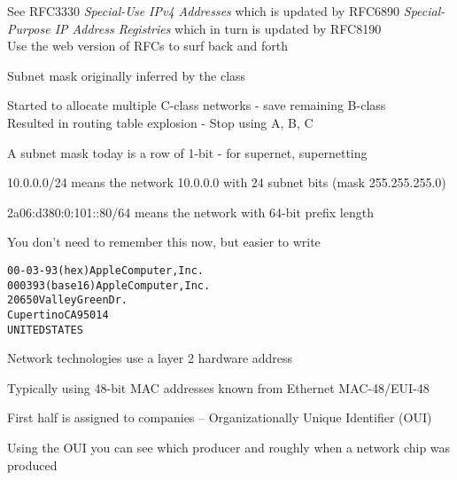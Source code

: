 \documentclass[Screen16to9,17pt]{foils}
\begin{document}
See RFC3330 \emph{Special-Use IPv4 Addresses} which is updated by
RFC6890 \emph{Special-Purpose IP Address Registries} which in turn is updated by RFC8190\\
Use the web version of RFCs to surf back and forth 




\begin{list2}
\item Subnet mask originally inferred by the class
\item Started to allocate multiple C-class networks - save remaining B-class\\
Resulted in routing table explosion - Stop using A, B, C
\item A subnet mask today is a row of 1-bit - for supernet, supernetting
\item 10.0.0.0/24 means the network 10.0.0.0 with 24 subnet bits (mask 255.255.255.0)
\item 2a06:d380:0:101::80/64 means the network with 64-bit prefix length
\item You don't need to remember this now, but easier to write
\end{list2}






\begin{alltt}
00-03-93   (hex)        Apple Computer, Inc.
000393     (base 16)    Apple Computer, Inc.
                        20650 Valley Green Dr.
                        Cupertino CA 95014
                        UNITED STATES
\end{alltt}
\begin{list1}
\item Network technologies use a layer 2 hardware address
\item Typically using 48-bit MAC addresses known from Ethernet MAC-48/EUI-48
\item First half is assigned to companies -- Organizationally Unique Identifier (OUI)
\item Using the OUI you can see which producer and roughly when a network chip was produced
\item {}
\end{list1}
\end{document}
